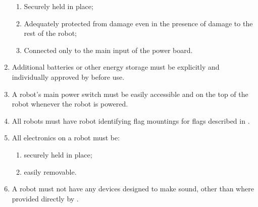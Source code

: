 \begin{enumerate}
  \begin{enumerate}
    \item Securely held in place;
    \item Adequately protected from damage even in the presence of damage to the
          rest of the robot;
    \item Connected only to the main input of the power board.
  \end{enumerate}
\item Additional batteries or other energy storage must be explicitly and
     individually approved by \org before use.
\item A robot's main power switch must be easily accessible and on the top of
      the robot whenever the robot is powered.
\item All robots must have robot identifying flag mountings for flags described in
      .
\item All electronics on a robot must be:
  \begin{enumerate}
    \item securely held in place;
    \item easily removable.
  \end{enumerate}
\item A robot must not have any devices designed to make sound, other than
      where provided directly by \org{}.
\end{enumerate}
